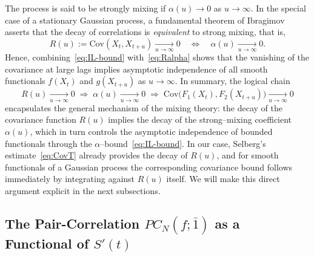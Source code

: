 \documentclass[12pt,reqno]{amsart}
\theoremstyle{plain}
\theoremstyle{definition}
\theoremstyle{remark}
\begin{document}
The process is said to be strongly mixing if $\alpha(u)\to0$ as $u\to\infty$.
In the special case of a stationary Gaussian process,
a fundamental theorem of Ibragimov~\cite{Ibragimov1962} asserts that
the decay of correlations is \emph{equivalent} to strong mixing, that is,
\begin{equation} \label{eq:Ralpha}
R(u):=\mathrm{Cov}(X_t,X_{t+u})\xrightarrow[u\to\infty]{}0
\quad\Longleftrightarrow\quad
\alpha(u)\xrightarrow[u\to\infty]{}0.
\end{equation}
Hence, combining~\eqref{eq:IL-bound} with~\eqref{eq:Ralpha} shows that
the vanishing of the covariance at large lags
implies asymptotic independence of all smooth functionals
$f(X_t)$ and $g(X_{t+u})$ as $u\to\infty$.
In summary, the logical chain
\begin{equation}
\label{eq:chain}
R(u)\xrightarrow[u\to\infty]{}0
\;\Longrightarrow\;
\alpha(u)\xrightarrow[u\to\infty]{}0
\;\Longrightarrow\;
\mathrm{Cov}\bigl(F_1(X_t),F_2(X_{t+u})\bigr)\xrightarrow[u\to\infty]{}0
\end{equation}
encapsulates the general mechanism of the mixing theory: 
the decay of the covariance function $R(u)$ implies the decay of the strong–mixing coefficient $\alpha(u)$, 
which in turn controls the asymptotic independence of bounded functionals through the $\alpha$–bound~\eqref{eq:IL-bound}.  
In our case, Selberg’s estimate~\eqref{eq:CovT} already provides the decay of $R(u)$, 
and for smooth functionals of a Gaussian process the corresponding covariance bound 
follows immediately by integrating against $R(u)$ itself.  
We will make this direct argument explicit in the next subsections.

\subsection{The Pair-Correlation $PC_N(f; \bar 1)$ as a Functional of $S'(t)$}
\label{ss:9.4}
\end{document}
